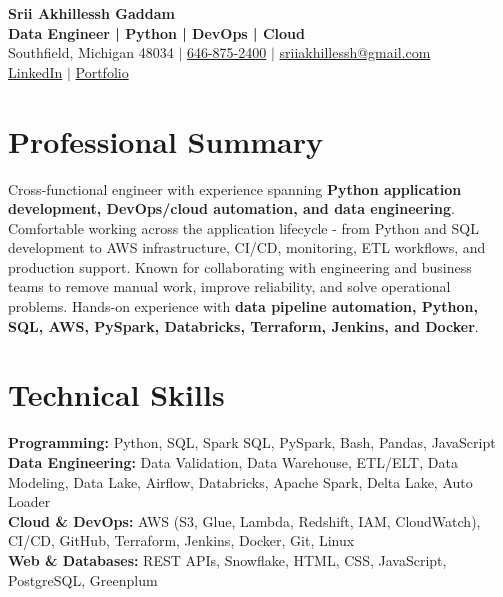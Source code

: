 \documentclass[letterpaper,10pt]{article}
\begin{document}
\fontsize{9.35pt}{10.45pt}\selectfont

\begin{center}
    {\LARGE \textbf{Srii Akhillessh Gaddam}} \\[-1pt]
    \textbf{Data Engineer | Python | DevOps | Cloud} \\[2pt]
    Southfield, Michigan 48034 $|$
    \href{tel:6468752400}{646-875-2400} $|$
    \href{mailto:sriiakhillessh@gmail.com}{sriiakhillessh@gmail.com} \\[1pt]
    \href{https://www.linkedin.com/in/srii-akhiilessh-gaddam-b48668191/}{LinkedIn} $|$
    \href{https://sriiakhillesshg.github.io/portfolio/}{Portfolio}
\end{center}
\vspace{-8pt}

\section{Professional Summary}
\small{Cross-functional engineer with experience spanning \textbf{Python application development, DevOps/cloud automation, and data engineering}. Comfortable working across the application lifecycle - from Python and SQL development to AWS infrastructure, CI/CD, monitoring, ETL workflows, and production support. Known for collaborating with engineering and business teams to remove manual work, improve reliability, and solve operational problems. Hands-on experience with \textbf{data pipeline automation, Python, SQL, AWS, PySpark, Databricks, Terraform, Jenkins, and Docker}.}

\section{Technical Skills}
\small{
\textbf{Programming:} Python, SQL, Spark SQL, PySpark, Bash, Pandas, JavaScript \\
\textbf{Data Engineering:} Data Validation, Data Warehouse, ETL/ELT, Data Modeling, Data Lake, Airflow, Databricks, Apache Spark, Delta Lake, Auto Loader \\
\textbf{Cloud \& DevOps:} AWS (S3, Glue, Lambda, Redshift, IAM, CloudWatch), CI/CD, GitHub, Terraform, Jenkins, Docker, Git, Linux \\
\textbf{Web \& Databases:} REST APIs, Snowflake, HTML, CSS, JavaScript, PostgreSQL, Greenplum
}
\end{document}
